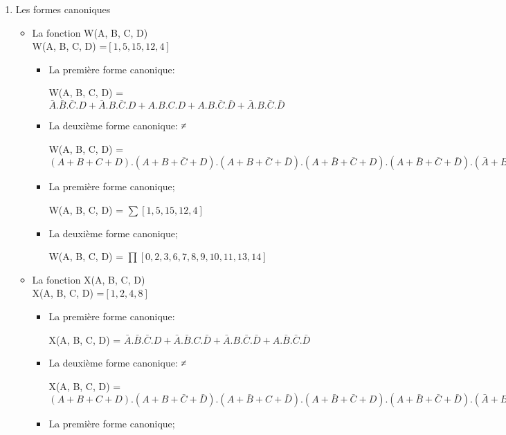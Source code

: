 \begin{enumerate}
\begin{tabular}{|c|c|c|c|c||c|c|c|c|}
        \end{tabular}
        \item Les formes canoniques \\\begin{itemize}
\item La fonction W(A, B, C, D) \\W(A, B, C, D) =$[1, 5, 15, 12, 4]$


\begin{itemize}
\item La première forme canonique: 

W(A, B, C, D) = $\bar A.\bar B.\bar C.D + \bar A.B.\bar C.D + A.B.C.D + A.B.\bar C.\bar D + \bar A.B.\bar C.\bar D$
\item La deuxième forme canonique: ≠

 W(A, B, C, D) = $(A+B+C+D) . (A+B+\bar C+D) . (A+B+\bar C+\bar D) . (A+\bar B+\bar C+D) . (A+\bar B+\bar C+\bar D) . (\bar A+B+C+D) . (\bar A+B+C+\bar D) . (\bar A+B+\bar C+D) . (\bar A+B+\bar C+\bar D) . (\bar A+\bar B+C+\bar D) . (\bar A+\bar B+\bar C+D)$
\item La première forme canonique; 

W(A, B, C, D) = $\sum [1, 5, 15, 12, 4]$
\item La deuxième forme canonique;  

 W(A, B, C, D) = $\prod [0, 2, 3, 6, 7, 8, 9, 10, 11, 13, 14]$
\end{itemize}\item La fonction X(A, B, C, D) \\X(A, B, C, D) =$[1, 2, 4, 8]$


\begin{itemize}
\item La première forme canonique: 

X(A, B, C, D) = $\bar A.\bar B.\bar C.D + \bar A.\bar B.C.\bar D + \bar A.B.\bar C.\bar D + A.\bar B.\bar C.\bar D$
\item La deuxième forme canonique: ≠

 X(A, B, C, D) = $(A+B+C+D) . (A+B+\bar C+\bar D) . (A+\bar B+C+\bar D) . (A+\bar B+\bar C+D) . (A+\bar B+\bar C+\bar D) . (\bar A+B+C+\bar D) . (\bar A+B+\bar C+D) . (\bar A+B+\bar C+\bar D) . (\bar A+\bar B+C+D) . (\bar A+\bar B+C+\bar D) . (\bar A+\bar B+\bar C+D) . (\bar A+\bar B+\bar C+\bar D)$
\item La première forme canonique; 


\end{itemize}
\end{itemize}
\end{enumerate}
